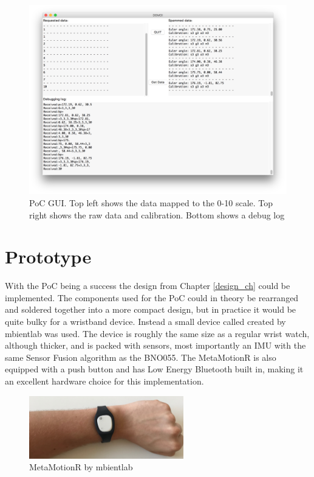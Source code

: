 \begin{figure}[h!]
    \centering
    \includegraphics[width=1.2\textwidth]{figures/poc_s1.png}
    \caption{PoC GUI. Top left shows the data mapped to the 0-10 scale. Top right shows the raw data and calibration. Bottom shows a debug log}
    \label{poc_s1}
\end{figure}


\section{Prototype}
With the PoC being a success the design from Chapter \ref{design_ch} could be implemented. The components used for the PoC could in theory be rearranged and soldered together into a more compact design, but in practice it would be quite bulky for a wristband device. Instead a small device called  created by mbientlab\cite{mbient} was used. The device is roughly the same size as a regular wrist watch, although thicker, and is packed with sensors, most importantly an IMU with the same Sensor Fusion algorithm as the BNO055. The MetaMotionR is also equipped with a push button and has Low Energy Bluetooth built in, making it an excellent hardware choice for this implementation.

\begin{figure}[h!]
    \centering
    \includegraphics[width=0.6\textwidth]{figures/mbient.jpg}
    \caption{MetaMotionR by mbientlab\cite{mbient}}
    \label{mbient}
\end{figure}

